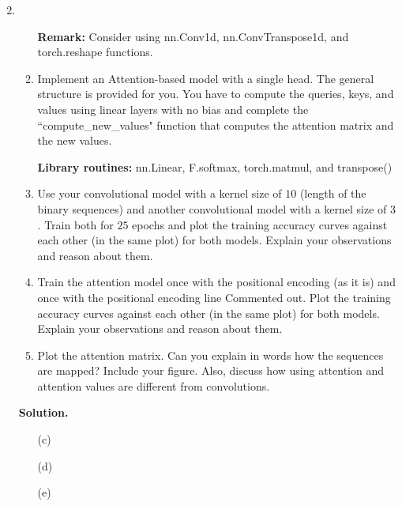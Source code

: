 \documentclass{article}
\theoremstyle{definition}
\theoremstyle{remark}
\newenvironment{Q}
{%
\clearpage
\item
}
{%
\phantom{s}%
\bigskip%
\noindent\textbf{Solution.}
}
\begin{document}
\begin{enumerate}[font={\Large\bfseries},left=0pt]
\begin{Q}
\begin{enumerate}
        \textbf{Remark:} Consider using nn.Conv1d, nn.ConvTranspose1d, and torch.reshape functions.

        \item Implement an Attention-based model with a single head. The general structure is provided for you. You have to compute the queries, keys, and values using linear layers with no bias and complete the ``compute\_new\_values" function that computes the attention matrix and the new values.
        
    \textbf{Library routines:}  nn.Linear, F.softmax, torch.matmul, and transpose()

        \item Use your convolutional model with a kernel size of $10$ (length of the binary sequences) and another convolutional model with a kernel size of $3$. Train both for $25$ epochs and plot the training accuracy curves against each other (in the same plot) for both models. Explain your observations and reason about them.
    

        \item Train the attention model once with the positional encoding (as it is) and once with the positional encoding line Commented out. Plot the training accuracy curves against each other (in the same plot) for both models. Explain your observations and reason about them.

        \item Plot the attention matrix. Can you explain in words how the sequences are mapped? Include your figure. Also, discuss how using attention and attention values are different from convolutions. 
        
    \end{enumerate}
\end{Q}

\begin{enumerate}
  \item[(c)]
  \item[(d)]
  \item[(e)]
\end{enumerate}



 


\end{enumerate}
\end{document}
